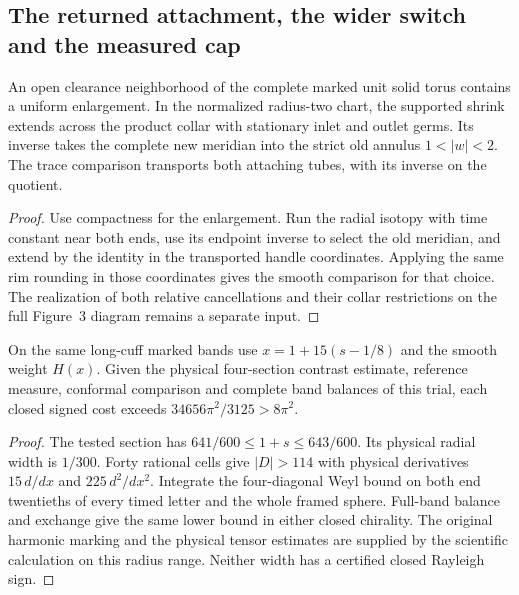 \subsection{The returned attachment, the wider switch and the measured cap}

\begin{proposition}
\label{prop:ed54-relative-trace}
\leanok
An open clearance neighborhood of the complete marked unit solid torus contains a uniform enlargement. In the normalized radius-two chart, the supported shrink extends across the product collar with stationary inlet and outlet germs. Its inverse takes the complete new meridian into the strict old annulus $1<|w|<2$. The trace comparison transports both attaching tubes, with its inverse on the quotient.
\end{proposition}
\begin{proof}
\leanok
Use compactness for the enlargement. Run the radial isotopy with time constant near both ends, use its endpoint inverse to select the old meridian, and extend by the identity in the transported handle coordinates. Applying the same rim rounding in those coordinates gives the smooth comparison for that choice. The realization of both relative cancellations and their collar restrictions on the full Figure~3 diagram remains a separate input.
\end{proof}

\begin{proposition}
\label{prop:ed54-widened-switch}
\leanok
On the same long-cuff marked bands use $x=1+15(s-1/8)$ and the smooth weight $H(x)$. Given the physical four-section contrast estimate, reference measure, conformal comparison and complete band balances of this trial, each closed signed cost exceeds $34656\pi^2/3125>8\pi^2$.
\end{proposition}
\begin{proof}
\leanok
The tested section has $641/600\leq 1+s\leq643/600$. Its physical radial width is $1/300$. Forty rational cells give $|D|>114$ with physical derivatives $15\,d/dx$ and $225\,d^2/dx^2$. Integrate the four-diagonal Weyl bound on both end twentieths of every timed letter and the whole framed sphere. Full-band balance and exchange give the same lower bound in either closed chirality. The original harmonic marking and the physical tensor estimates are supplied by the scientific calculation on this radius range. Neither width has a certified closed Rayleigh sign.
\end{proof}

